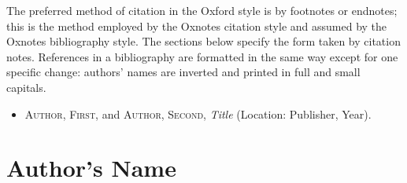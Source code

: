 \documentclass[extrafontsizes,11pt,a4paper,oneside]{memoir}
\newcommand*{\lit}[1]{\textsf{#1}}
\begin{document}
The preferred method of citation in the Oxford style is by footnotes or endnotes; this is the method employed by the Oxnotes citation style and assumed by the Oxnotes bibliography style. The sections below specify the form taken by citation notes. References in a bibliography are formatted in the same way except for one specific change: authors' names are inverted and printed in full and small capitals.

\begin{itemize}
  \item
  \textsc{Author, First}, \lit{and} \textsc{Author, Second}, \emph{Title} (Location: Publisher, Year).
\end{itemize}

\section{Author's Name}
\end{document}
